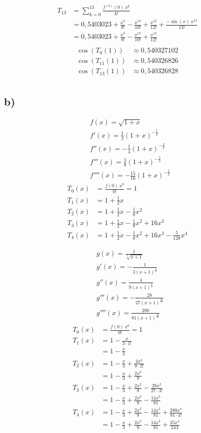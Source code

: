\documentclass[a4paper]{scrartcl}
\begin{document}
\begin{align}
T_{13}&=\sum_{k=0}^{13}\frac{f^{(k)}(0)\ x^k}{k!}\\
	&=0,5403023+\frac{x^8}{8!}-\frac{x^{10}}{10!}+\frac{x^{12}}{12!}+\frac{-\sin(x)\ x^{13}}{13!}\\
	&=0,5403023+\frac{x^8}{8!}-\frac{x^{10}}{10!}+\frac{x^{12}}{12!}\\
\end{align}
\begin{align}
\cos(T_9(1))&\approx 0,540327102\\
\cos(T_{11}(1))&\approx 0,540326826\\
\cos(T_{13}(1))&\approx 0,540326828\\
\end{align}

\subsection{b)}
\begin{align}
&f(x)=\sqrt{1+x} \\
&f'(x)=\frac 1 2 (1+x)^{-\frac 1 2} \\
&f''(x)=-\frac 1 4 (1+x)^{-\frac 3 2} \\
&f'''(x)=\frac 3 8 (1+x)^{-\frac 5 2} \\
&f''''(x)=-\frac {15} {16} (1+x)^{-\frac 7 2}
\end{align}
\begin{align}
T_0(x)&=\frac{f(0)\ x^0}{0!}=1 \\
T_1(x)&=1 + \frac 1 2 x \\
T_2(x)&=1 + \frac 1 2 x - \frac 1 8 x^2 \\
T_3(x)&=1 + \frac 1 2 x - \frac 1 8 x^2 + 16x^3 \\
T_4(x)&=1 + \frac 1 2 x - \frac 1 8 x^2 + 16x^3 - \frac 5 {128}x^4
\end{align}

\begin{align}
&g(x)=\frac{1}{\sqrt[3]{x+1}}\\
&g'(x)=-\frac{1}{3(x+1)^{\frac{4}{3}}}\\
&g''(x)=\frac{4}{9(x+1)^{\frac{7}{3}}}\\
&g'''(x)=-\frac{28}{27(x+1)^{\frac{10}{3}}}\\
&g''''(x)=\frac{280}{81(x+1)^{\frac{13}{3}}}
\end{align}
\begin{align}
T_0(x)&=\frac{f(0)\ x^0}{0!}=1\\
T_1(x)&=1-\frac{x}{3\cdot 1!}\\
	&=1-\frac{x}{3}\\
T_2(x)&=1-\frac{x}{3}+\frac{4x^2}{9\cdot 2!}\\
	&=1-\frac{x}{3}+\frac{2x^2}{9}\\
T_3(x)&=1-\frac{x}{3}+\frac{2x^2}{9}-\frac{28x^3}{27\cdot 3!}\\
	&=1-\frac{x}{3}+\frac{2x^2}{9}-\frac{14x^3}{81}\\
T_4(x)&=1-\frac{x}{3}+\frac{2x^2}{9}-\frac{14x^3}{81}+\frac{280x^4}{81\cdot 4!}\\
	&=1-\frac{x}{3}+\frac{2x^2}{9}-\frac{14x^3}{81}+\frac{35x^4}{243}\\
\end{align}
\end{document}
